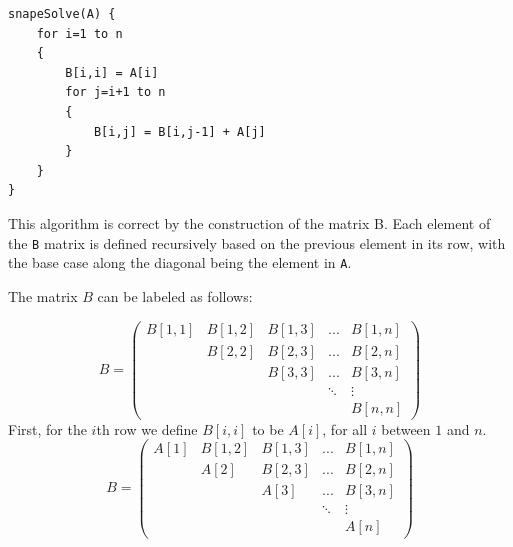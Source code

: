 \documentclass[12pt]{article}
\begin{document}
\begin{enumerate}
\begin{enumerate}
	\newpage
	
	\begin{verbatim}
snapeSolve(A) {
    for i=1 to n
    {
        B[i,i] = A[i]
        for j=i+1 to n
        {
            B[i,j] = B[i,j-1] + A[j]
        }
    }
}
	\end{verbatim}
	
	
	This algorithm is correct by the construction of the matrix B. Each element of the \texttt{B} matrix is defined recursively based on the previous element in its row, with the base case along the diagonal being the element 
in \texttt{A}.
	
	The matrix $B$ can be labeled as follows:
	
	\[
	B=
	\left(
	\begin{array}{ccccc}
	B[1,1] & B[1,2] & B[1,3] & ... & B[1,n]\\
	& B[2,2] & B[2,3] & ... & B[2,n]\\
	&& B[3,3] & ... & B[3,n]\\
	&&&\ddots & \vdots\\
	&&&& B[n,n]
	\end{array}
	\right)
	\]
	First, for the $i$th row we define $B[i,i]$ to be $A[i]$, for all $i$ between $1$ and $n$.
	\[
	B=
	\left(
	\begin{array}{ccccc}
	A[1] & B[1,2] & B[1,3] & ... & B[1,n]\\
	& A[2] & B[2,3] & ... & B[2,n]\\
	&& A[3] & ... & B[3,n]\\
	&&&\ddots & \vdots\\
	&&&& A[n]
	\end{array}
	\right)
	\]
	

\end{enumerate}
\end{enumerate}
\end{document}

